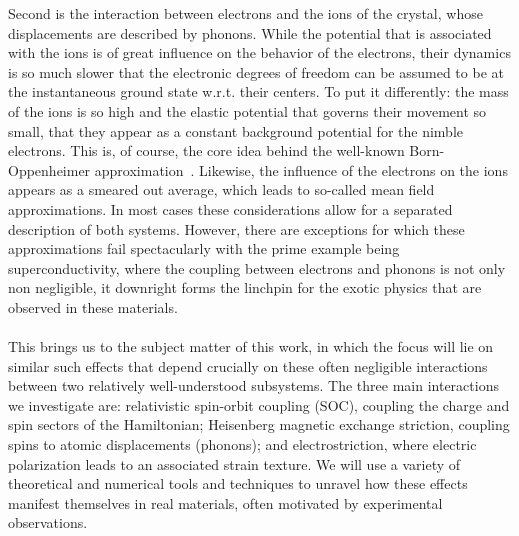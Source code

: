 Second is the interaction between electrons and the ions of the crystal, whose displacements are described by phonons.
While the potential that is associated with the ions is of great influence on the behavior of the electrons, their dynamics is so much slower that the electronic degrees of freedom can be assumed to be at the instantaneous ground state w.r.t. their centers.
To put it differently: the mass of the ions is so high and the elastic potential that governs their movement so small, that they appear as a constant background potential for the nimble electrons.
This is, of course, the core idea behind the well-known Born-Oppenheimer approximation~\cite{Born1927}.
Likewise, the influence of the electrons on the ions appears as a smeared out average, which leads to so-called mean field approximations.
In most cases these considerations allow for a separated description of both systems.
However, there are exceptions for which these approximations fail spectacularly with the prime example being superconductivity, where the coupling between electrons and phonons is not only non negligible, it downright forms the linchpin for the exotic physics that are observed in these materials.
\\\\
This brings us to the subject matter of this work, in which the focus will lie on similar such effects that depend crucially on these often negligible interactions between two relatively well-understood subsystems.
The three main interactions we investigate are: relativistic spin-orbit coupling (SOC), coupling the charge and spin sectors of the Hamiltonian; Heisenberg magnetic exchange striction, coupling spins to atomic displacements (phonons); and electrostriction, where electric polarization leads to an associated strain texture.
We will use a variety of theoretical and numerical tools and techniques to unravel how these effects manifest themselves in real materials, often motivated by experimental observations.

